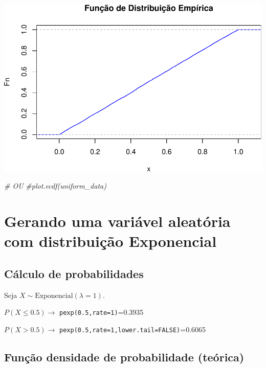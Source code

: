 \documentclass[
]{book}
\newenvironment{Shaded}{\begin{snugshade}}{\end{snugshade}}
\newcommand{\CommentTok}[1]{\textcolor[rgb]{0.56,0.35,0.01}{\textit{#1}}}
\theoremstyle{definition}
\theoremstyle{definition}
\theoremstyle{definition}
\theoremstyle{definition}
\theoremstyle{remark}
\begin{document}
\includegraphics{meuLivro2_files/figure-latex/unnamed-chunk-122-1.pdf}

\begin{Shaded}
\begin{Highlighting}[]
\CommentTok{\# OU}
\CommentTok{\#plot.ecdf(uniform\_data)}
\end{Highlighting}
\end{Shaded}

\section{Gerando uma variável aleatória com distribuição Exponencial}\label{gerando-uma-variuxe1vel-aleatuxf3ria-com-distribuiuxe7uxe3o-exponencial}

\subsection{Cálculo de probabilidades}\label{cuxe1lculo-de-probabilidades-3}

Seja \(X\sim \text{Exponencial}(\lambda=1)\).

\(P(X\leq 0.5) \to\) \texttt{pexp(0.5,rate=1)}=0.3935

\(P(X > 0.5) \to\) \texttt{pexp(0.5,rate=1,lower.tail=FALSE)}=0.6065

\subsection{Função densidade de probabilidade (teórica)}\label{funuxe7uxe3o-densidade-de-probabilidade-teuxf3rica}
\end{document}

